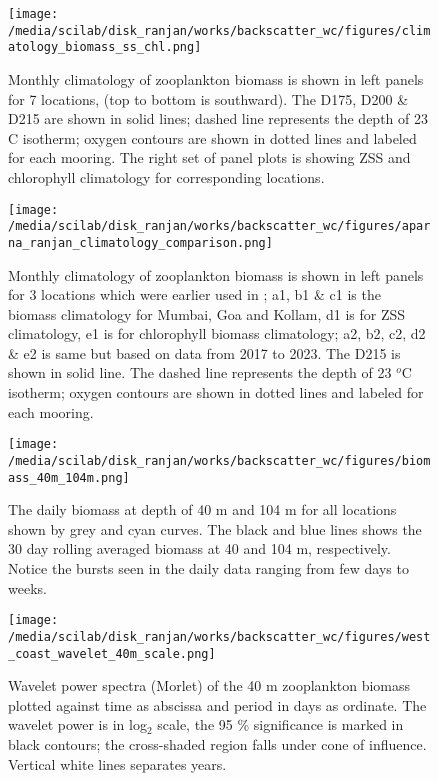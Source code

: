 \documentclass{article}
\begin{document}
\begin{figure}[htbp]
	\centering
	\texttt{[image: /media/scilab/disk\_ranjan/works/backscatter\_wc/figures/climatology\_biomass\_ss\_chl.png]} 
	\captionsetup{justification=justified,font=footnotesize,skip=0.05\baselineskip,width=\textwidth}
	\caption{Monthly climatology of zooplankton biomass is shown in left panels for 7 locations, (top to bottom is southward). The D175, D200 \& D215 are shown in solid lines; dashed line represents the depth of 23 C isotherm; oxygen contours are shown in dotted lines and labeled for each mooring. The right set of panel plots is showing ZSS and chlorophyll climatology for corresponding locations.}
	\label{fig:fig4}
\end{figure}

\begin{figure}[htbp]
	\centering
	\texttt{[image: /media/scilab/disk\_ranjan/works/backscatter\_wc/figures/aparna\_ranjan\_climatology\_comparison.png]} 
	\captionsetup{justification=justified,font=footnotesize,skip=0.05\baselineskip,width=\textwidth}
	\caption{Monthly climatology of zooplankton biomass is shown in left panels for 3 locations which were earlier used in \citep{aparna2022seasonal}; a1, b1 \& c1 is the biomass climatology for Mumbai, Goa and Kollam, d1 is for ZSS climatology, e1 is for chlorophyll biomass climatology; a2, b2, c2, d2 \& e2 is same but based on data from 2017 to 2023. The D215 is shown in solid line. The dashed line represents the depth of 23 $^o$C isotherm; oxygen contours are shown in dotted lines and labeled for each mooring.}
	\label{fig:fig5}
\end{figure}

\begin{figure}[htbp]
	\centering
	\texttt{[image: /media/scilab/disk\_ranjan/works/backscatter\_wc/figures/biomass\_40m\_104m.png]} 
	\captionsetup{justification=justified,font=footnotesize,skip=0.05\baselineskip,width=\textwidth}
	\caption{The daily biomass at depth of 40 m and 104 m for all locations shown by grey and cyan curves. The black and blue lines shows the 30 day rolling averaged biomass at 40 and 104 m, respectively. Notice the bursts seen in the daily data ranging from few days to weeks.}
	\label{fig:fig6}
\end{figure}

\begin{figure}[htbp]
	\centering
	\texttt{[image: /media/scilab/disk\_ranjan/works/backscatter\_wc/figures/west\_coast\_wavelet\_40m\_scale.png]} 
	\captionsetup{justification=justified,font=footnotesize,skip=0.05\baselineskip,width=\textwidth}
	\caption{Wavelet power spectra (Morlet) of the 40 m zooplankton biomass plotted against time as abscissa and period in days as ordinate. The wavelet power is in log$_2$ scale, the 95 \% significance is marked in black contours; the cross-shaded region falls under cone of influence. Vertical white lines separates years.}
	\label{fig:fig7}
\end{figure}
\end{document}

